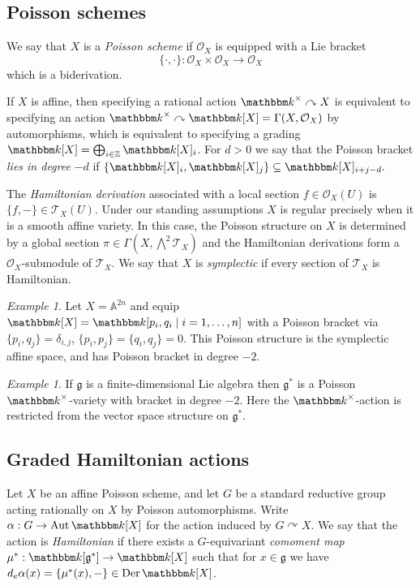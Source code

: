 \documentclass[twoside,12pt,reqno]{amsart}
\theoremstyle{remark}
\newtheorem{Example}[Theorem]{Example}
\numberwithin{equation}{section}
\def\k{{\mathbbm k}}
\def\Der{\operatorname{Der}}
\def\Aut{\operatorname{Aut}}
\def\Z{{\mathbb Z}}
\def\bbA{{\mathbb A}}
\def\g{{\mathfrak g}}
\def\Oc{\mathcal{O}}
\def\T{\mathcal{T}}
\begin{document}
\subsection{Poisson schemes}

We say that $X$ is a {\em Poisson scheme} if $\Oc_X$ is equipped with a Lie bracket
$$\{ \cdot , \cdot \} : \Oc_X \times \Oc_X \longrightarrow \Oc_X$$
which is a biderivation.

If $X$ is affine, then specifying a rational action $\k^\times \curvearrowright X$ is equivalent to specifying an action $\k^\times \curvearrowright \k[X]= \Gamma(X,\Oc_X)$ by automorphisms, which is equivalent to specifying a grading $\k[X] = \bigoplus_{i\in \Z} \k[X]_i$. For $d > 0$ we say that the Poisson bracket {\it lies in degree} $-d$ if $\{\k[X]_i, \k[X]_j\} \subseteq \k[X]_{i+j-d}.$

The {\it Hamiltonian derivation} associated with a local section $f\in \Oc_X(U)$ is $\{f, -\} \in \T_X(U)$. Under our standing assumptions $X$ is regular precisely when it is a smooth affine variety. In this case, the Poisson structure on $X$ is determined by a global section $\pi \in \Gamma(X, \bigwedge^2 \T_X)$ and the Hamiltonian derivations form a $\Oc_X$-submodule of $\T_X$. We say that $X$ is {\it symplectic} if every section of $\T_X$ is Hamiltonian.

\begin{Example}
\label{ex:symplecticaffinespace}
Let $X = \bbA^{2n}$ and equip $\k[X] = \k[p_{i}, q_i \mid i=1,\ldots,n]$ with a Poisson bracket via $\{p_i, q_j\} = \delta_{i,j}$, $\{p_i, p_j\} = \{q_i, q_j\} = 0$. This Poisson structure is the symplectic affine space, and has Poisson bracket in degree $-2$.
\end{Example}

\begin{Example}
\label{ex:PoissonLiestructure}
If $\g$ is a finite-dimensional Lie algebra then $\g^*$ is a Poisson $\k^\times$-variety with bracket in degree $-2$. Here the $\k^\times$-action is restricted from the vector space structure on $\g^*$.
\end{Example}


\subsection{Graded Hamiltonian actions}
\label{ss:gradedHamactions}

Let $X$ be an affine Poisson scheme, and let $G$ be a standard reductive group acting rationally on $X$ by Poisson automorphisms. Write $\alpha : G \to \Aut\k[X]$ for the action induced by $G\curvearrowright X$. We say that the action is {\it Hamiltonian} if there exists a $G$-equivariant {\it comoment map} $\mu^* : \k[\g^*] \to \k[X]$ such that for $x\in \g$ we have $d_e\alpha(x) = \{\mu^*(x), - \} \in \Der \k[X]$.
\end{document}
